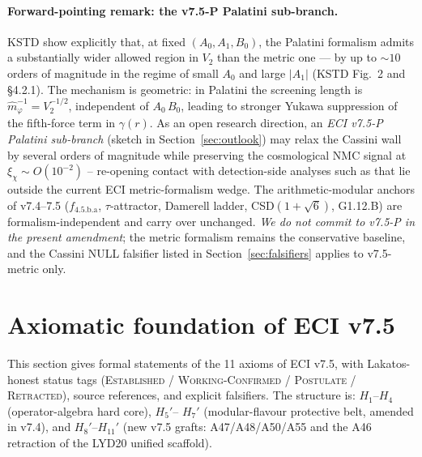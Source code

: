 \documentclass[a4paper,11pt]{article}
\newcommand{\fLM}{f_{\text{4.5.b.a}}}
\theoremstyle{definition}
\theoremstyle{remark}
\begin{document}
\paragraph{Forward-pointing remark: the v7.5-P Palatini sub-branch.}
KSTD show explicitly that, at fixed $(A_0,A_1,B_0)$, the Palatini
formalism admits a substantially wider allowed region in $V_2$
than the metric one --- by up to $\sim 10$ orders of magnitude in
the regime of small $A_0$ and large $|A_1|$ (KSTD Fig.~2 and
\S 4.2.1).  The mechanism is geometric: in Palatini the screening
length is $\hat m_\varphi^{-1} = V_2^{-1/2}$, independent of
$A_0\,B_0$, leading to stronger Yukawa suppression of the
fifth-force term in $\gamma(r)$.  As an open research direction,
an \emph{ECI v7.5-P Palatini sub-branch} (sketch in
Section~\ref{sec:outlook}) may relax the Cassini wall by several
orders of magnitude while preserving the cosmological NMC signal
at $\xi_\chi\sim O(10^{-2})$ -- re-opening contact with
detection-side analyses such as \cite{Wolf25} that lie outside
the current ECI metric-formalism wedge.  The arithmetic-modular
anchors of v7.4--7.5 ($\fLM$, $\tau$-attractor, Damerell ladder,
CSD$(1+\sqrt 6)$, G1.12.B) are formalism-independent and carry
over unchanged.  \emph{We do not commit to v7.5-P in the present
amendment}; the metric formalism remains the conservative
baseline, and the Cassini NULL falsifier listed in
Section~\ref{sec:falsifiers} applies to v7.5-metric only.

\section{Axiomatic foundation of ECI v7.5}
\label{sec:axioms-v75}

This section gives formal statements of the 11 axioms of ECI v7.5,
with Lakatos-honest status tags (\textsc{Established} /
\textsc{Working-Confirmed} / \textsc{Postulate} / \textsc{Retracted}),
source references, and explicit falsifiers.
The structure is: $H_1$--$H_4$ (operator-algebra hard core), $H_5'$--%
$H_7'$ (modular-flavour protective belt, amended in v7.4), and
$H_8'$--$H_{11}'$ (new v7.5 grafts: A47/A48/A50/A55 and the A46
retraction of the LYD20 unified scaffold).
\end{document}
